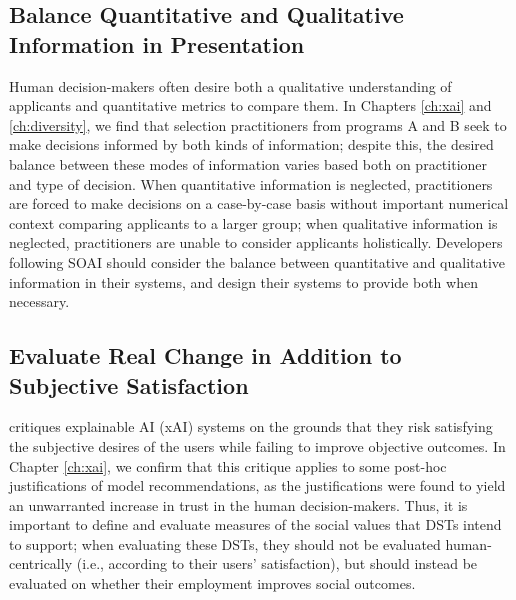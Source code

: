 \subsection{Balance Quantitative and Qualitative Information in Presentation}
Human decision-makers often desire both a qualitative understanding of applicants and quantitative metrics to compare them. In Chapters \ref{ch:xai} and \ref{ch:diversity}, we find that selection practitioners from programs A and B seek to make decisions informed by both kinds of information; despite this, the desired balance between these modes of information varies based both on practitioner and type of decision. When quantitative information is neglected, practitioners are forced to make decisions on a case-by-case basis without important numerical context comparing applicants to a larger group; when qualitative information is neglected, practitioners are unable to consider applicants holistically. Developers following SOAI should consider the balance between quantitative and qualitative information in their systems, and design their systems to provide both when necessary.

\subsection{Evaluate Real Change in Addition to Subjective Satisfaction}
\textcite{Lipton} critiques explainable AI (xAI) systems on the grounds that they risk satisfying the subjective desires of the users while failing to improve objective outcomes. In Chapter \ref{ch:xai}, we confirm that this critique applies to some post-hoc justifications of model recommendations, as the justifications were found to yield an unwarranted increase in trust in the human decision-makers. Thus, it is important to define and evaluate measures of the social values that DSTs intend to support; when evaluating these DSTs, they should not be evaluated human-centrically (i.e., according to their users' satisfaction), but should instead be evaluated on whether their employment improves social outcomes.

